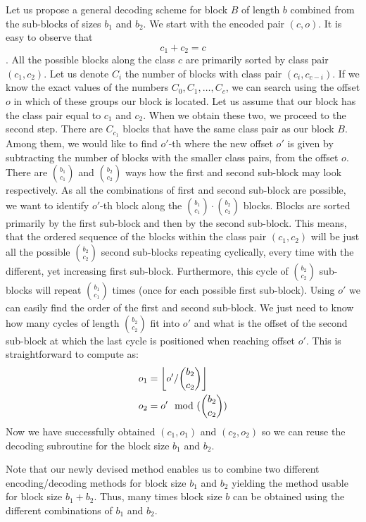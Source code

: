 Let us propose a general decoding scheme for block $B$ of length $b$ combined from the
sub-blocks of sizes $b_1$ and $b_2$. We start with the encoded pair $(c, o)$. It is easy
to observe that $$c_1 + c_2 = c$$. All the possible blocks along the class $c$ are primarily
sorted by class pair $(c_1, c_2)$. Let us denote $C_i$ the number of blocks with class
pair $(c_i, c_{c-i})$. If we know the exact values of the numbers $C_0, C_1, \ldots , C_c$,
we can search using the offset $o$ in which of these groups our block is located. Let us
assume that our block has the class pair equal to $c_1$ and $c_2$. When we obtain these two,
we proceed to the second step. There are $C_{c_1}$ blocks that have the same class pair
as our block $B$. Among them, we would like to find $o'$-th where the new offset $o'$
is given by subtracting the number of blocks with the smaller class pairs, from the offset
$o$. There are ${b_1 \choose c_1}$ and ${b_2 \choose c_2}$ ways how the first and second
sub-block may look respectively. As all the combinations of first and second sub-block are
possible, we want to identify $o'$-th block along the ${b_1 \choose c_1}\cdot {b_2 \choose c_2}$
blocks. Blocks are sorted primarily by the first sub-block and then by the second sub-block.
This means, that the ordered sequence of the blocks within the class pair $(c_1, c_2)$ will be
just all the possible ${b_2 \choose c_2}$ second sub-blocks repeating cyclically, every time
with the different, yet increasing first sub-block. Furthermore, this cycle of
${b_2 \choose c_2}$ sub-blocks will repeat ${b_1 \choose c_1}$ times (once for each possible
first sub-block). Using $o'$ we can easily find the order of the first and second sub-block.
We just need to know how many cycles of length ${b_2 \choose c_2}$ fit into $o'$ and what is
the offset of the second sub-block at which the last cycle is positioned when reaching 
offset $o'$. This is straightforward to compute as:
\begin{align*}
    o_1 &= \floor{o'/{b_2 \choose c_2}} \\
    o_2 &= o'\mod ({b_2 \choose c_2})\\ %
\end{align*}
Now we have successfully obtained $(c_1, o_1)$ and $(c_2, o_2)$ so we can reuse
the decoding subroutine for the block size $b_1$ and $b_2$.

Note that our newly devised method enables us to combine two different encoding/decoding methods
for block size $b_1$ and $b_2$ yielding the method usable for block size $b_1+b_2$. Thus, many
times block size $b$ can be obtained using the different combinations of $b_1$ and $b_2$.

